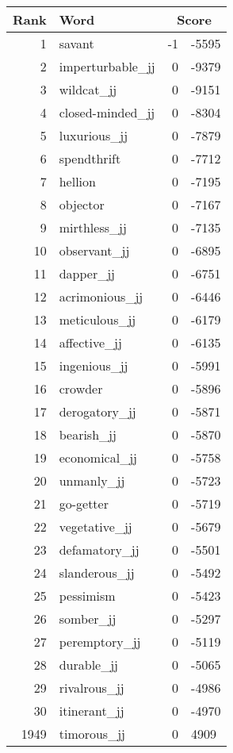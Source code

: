 \begin{longtable}[!htbp]{| rlr@{.}l |}
    \hline
    \textbf{Rank} & \textbf{Word} & \multicolumn{2}{c|}{\textbf{Score}} \\
    \hline
    \endhead
    1 & savant & -1 & -5595 \\
    2 & imperturbable\_jj & 0 & -9379 \\
    3 & wildcat\_jj & 0 & -9151 \\
    4 & closed-minded\_jj & 0 & -8304 \\
    5 & luxurious\_jj & 0 & -7879 \\
    6 & spendthrift & 0 & -7712 \\
    7 & hellion & 0 & -7195 \\
    8 & objector & 0 & -7167 \\
    9 & mirthless\_jj & 0 & -7135 \\
    10 & observant\_jj & 0 & -6895 \\
    11 & dapper\_jj & 0 & -6751 \\
    12 & acrimonious\_jj & 0 & -6446 \\
    13 & meticulous\_jj & 0 & -6179 \\
    14 & affective\_jj & 0 & -6135 \\
    15 & ingenious\_jj & 0 & -5991 \\
    16 & crowder & 0 & -5896 \\
    17 & derogatory\_jj & 0 & -5871 \\
    18 & bearish\_jj & 0 & -5870 \\
    19 & economical\_jj & 0 & -5758 \\
    20 & unmanly\_jj & 0 & -5723 \\
    21 & go-getter & 0 & -5719 \\
    22 & vegetative\_jj & 0 & -5679 \\
    23 & defamatory\_jj & 0 & -5501 \\
    24 & slanderous\_jj & 0 & -5492 \\
    25 & pessimism & 0 & -5423 \\
    26 & somber\_jj & 0 & -5297 \\
    27 & peremptory\_jj & 0 & -5119 \\
    28 & durable\_jj & 0 & -5065 \\
    29 & rivalrous\_jj & 0 & -4986 \\
    30 & itinerant\_jj & 0 & -4970 \\
    1949 & timorous\_jj & 0 & 4909 \\

\end{longtable}

